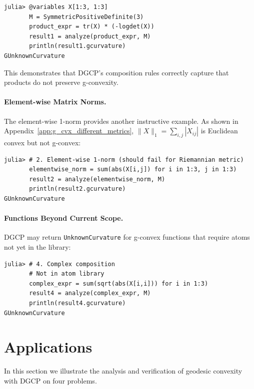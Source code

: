 \documentclass[twoside,11pt]{article}
\begin{document}
\begin{listing}[!h]
\begin{verbatim}
julia> @variables X[1:3, 1:3]
       M = SymmetricPositiveDefinite(3)
       product_expr = tr(X) * (-logdet(X))
       result1 = analyze(product_expr, M)
       println(result1.gcurvature)
GUnknownCurvature
\end{verbatim}
\end{listing}

This demonstrates that DGCP's composition rules correctly capture that products do not preserve g-convexity.

\paragraph{Element-wise Matrix Norms.}
The element-wise 1-norm provides another instructive example. As shown in Appendix~\ref{app:g_cvx_different_metrics}, $\|X\|_1 = \sum_{i,j} |X_{ij}|$ is Euclidean convex but not g-convex:

\begin{listing}[!h]
\begin{verbatim}
julia> # 2. Element-wise 1-norm (should fail for Riemannian metric)
       elementwise_norm = sum(abs(X[i,j]) for i in 1:3, j in 1:3)
       result2 = analyze(elementwise_norm, M)
       println(result2.gcurvature)
GUnknownCurvature
\end{verbatim}
\end{listing}

\paragraph{Functions Beyond Current Scope.}
DGCP may return \texttt{UnknownCurvature} for g-convex functions that require atoms not yet in the library:

\begin{listing}[h!]
    \begin{verbatim}
julia> # 4. Complex composition
       # Not in atom library
       complex_expr = sum(sqrt(abs(X[i,i])) for i in 1:3)
       result4 = analyze(complex_expr, M)
       println(result4.gcurvature)
GUnknownCurvature
\end{verbatim}
\end{listing}


\section{Applications}
In this section we illustrate the analysis and verification of geodesic convexity with DGCP on four problems.
\end{document}
